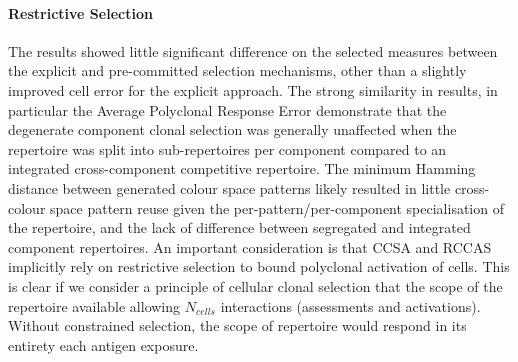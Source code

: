\paragraph{Restrictive Selection}
The results showed little significant difference on the selected measures between the explicit and pre-committed selection mechanisms, other than a slightly improved cell error for the explicit approach. The strong similarity in results, in particular the Average Polyclonal Response Error demonstrate that the degenerate component clonal selection was generally unaffected when the repertoire was split into sub-repertoires per component compared to an integrated cross-component competitive repertoire. The minimum Hamming distance between generated colour space patterns likely resulted in little cross-colour space pattern reuse given the per-pattern/per-component specialisation of the repertoire, and the lack of difference between segregated and integrated component repertoires.
An important consideration is that CCSA and RCCAS implicitly rely on restrictive selection to bound polyclonal activation of cells. This is clear if we consider a principle of cellular clonal selection that the scope of the repertoire available allowing $N_{cells}$ interactions (assessments and activations). Without constrained selection, the scope of repertoire would respond in its entirety each antigen exposure.

%
%
